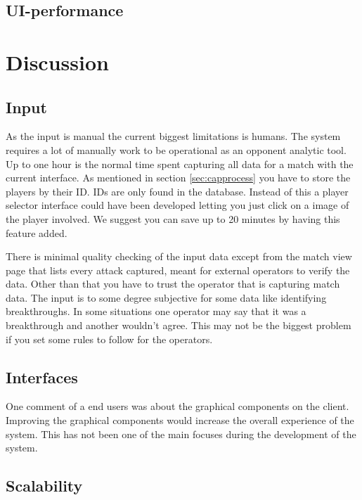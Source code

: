 \subsection{UI-performance}

\section{Discussion}
\subsection{Input}

As the input is manual the current biggest limitations is humans. The system requires a lot of manually work to be operational as an opponent analytic tool. Up to one hour is the normal time spent capturing all data for a match with the current interface. As mentioned in section \ref{sec:capprocess} you have to store the players by their ID. IDs are only found in the database. Instead of this a player selector interface could have been developed letting you just click on a image of the player involved. We suggest you can save up to 20 minutes by having this feature added.

There is minimal quality checking of the input data except from the match view page that lists every attack captured, meant for external operators to verify the data. Other than that you have to trust the operator that is capturing match data. The input is to some degree subjective for some data like identifying breakthroughs. In some situations one operator may say that it was a breakthrough and another wouldn't agree. This may not be the biggest problem if you set some rules to follow for the operators.

\subsection{Interfaces}

One comment of a end users was about the graphical components on the client. Improving the graphical components would increase the overall experience of the system. This has not been one of the main focuses during the development of the system.

\subsection{Scalability}


